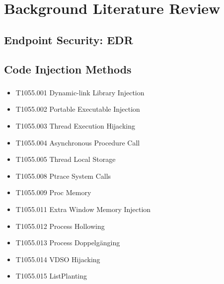 \documentclass{article}
\begin{document}
\section{Background Literature Review}


\subsection{Endpoint Security: EDR}

\subsubsection{}
\textcite{Hayes:2023}


\subsection{Code Injection Methods}

\subsubsection{}
\textcite{Mitre:2017}

\begin{itemize}
\item T1055.001	Dynamic-link Library Injection
\item T1055.002	Portable Executable Injection
\item T1055.003	Thread Execution Hijacking
\item T1055.004	Asynchronous Procedure Call
\item T1055.005	Thread Local Storage
\item T1055.008	Ptrace System Calls
\item T1055.009	Proc Memory
\item T1055.011	Extra Window Memory Injection
\item T1055.012	Process Hollowing
\item T1055.013	Process Doppelgänging
\item T1055.014	VDSO Hijacking
\item T1055.015	ListPlanting
\end{itemize}
\end{document}
